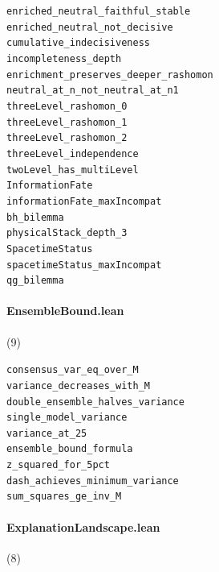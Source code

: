 {\footnotesize
\texttt{enriched\_neutral\_faithful\_stable}\\
\texttt{enriched\_neutral\_not\_decisive}\\
\texttt{cumulative\_indecisiveness}\\
\texttt{incompleteness\_depth}\\
\texttt{enrichment\_preserves\_deeper\_rashomon}\\
\texttt{neutral\_at\_n\_not\_neutral\_at\_n1}\\
\texttt{threeLevel\_rashomon\_0}\\
\texttt{threeLevel\_rashomon\_1}\\
\texttt{threeLevel\_rashomon\_2}\\
\texttt{threeLevel\_independence}\\
\texttt{twoLevel\_has\_multiLevel}\\
\texttt{InformationFate}\\
\texttt{informationFate\_maxIncompat}\\
\texttt{bh\_bilemma}\\
\texttt{physicalStack\_depth\_3}\\
\texttt{SpacetimeStatus}\\
\texttt{spacetimeStatus\_maxIncompat}\\
\texttt{qg\_bilemma}\\
}

\paragraph{EnsembleBound.lean} (9)

{\footnotesize
\texttt{consensus\_var\_eq\_over\_M}\\
\texttt{variance\_decreases\_with\_M}\\
\texttt{double\_ensemble\_halves\_variance}\\
\texttt{single\_model\_variance}\\
\texttt{variance\_at\_25}\\
\texttt{ensemble\_bound\_formula}\\
\texttt{z\_squared\_for\_5pct}\\
\texttt{dash\_achieves\_minimum\_variance}\\
\texttt{sum\_squares\_ge\_inv\_M}\\
}

\paragraph{ExplanationLandscape.lean} (8)

